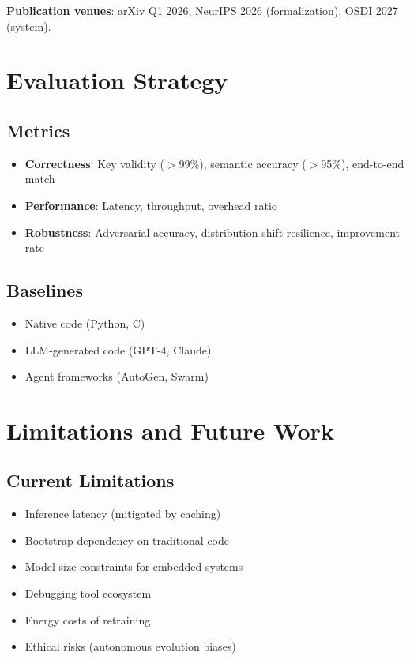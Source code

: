 \documentclass[11pt,a4paper]{article}
\begin{document}
\noindent\textbf{Publication venues}: arXiv Q1 2026, NeurIPS 2026 (formalization), OSDI 2027 (system).

\section{Evaluation Strategy}

\subsection{Metrics}

\begin{itemize}
    \item \textbf{Correctness}: Key validity ($>$99\%), semantic accuracy ($>$95\%), end-to-end match
    \item \textbf{Performance}: Latency, throughput, overhead ratio
    \item \textbf{Robustness}: Adversarial accuracy, distribution shift resilience, improvement rate
\end{itemize}

\subsection{Baselines}

\begin{itemize}
    \item Native code (Python, C)
    \item LLM-generated code (GPT-4, Claude)
    \item Agent frameworks (AutoGen, Swarm)
\end{itemize}

\section{Limitations and Future Work}

\subsection{Current Limitations}

\begin{itemize}
    \item Inference latency (mitigated by caching)
    \item Bootstrap dependency on traditional code
    \item Model size constraints for embedded systems
    \item Debugging tool ecosystem
    \item Energy costs of retraining
    \item Ethical risks (autonomous evolution biases)
\end{itemize}
\end{document}
